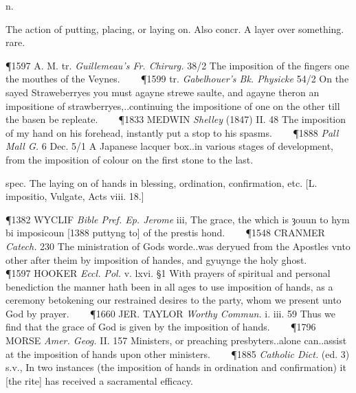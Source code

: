 \begin{description}[wide, labelwidth=!, labelindent=0pt]
 n.

\noindent {}

\vspace{-0.3cm}

\begin{myenumerate}

 The action of putting, placing, or laying on. Also concr. A layer over something. rare.

\P 1597 A. M. tr.  \textit{Guillemeau's Fr. Chirurg.} 38/2 The imposition of the fingers one the mouthes of the Veynes.    
\P 1599  tr. \textit{ Gabelhouer's Bk. Physicke} 54/2 On the sayed Straweberryes you must agayne strewe saulte, and agayne theron an impositione of strawberryes,..continuing the impositione of one on the other till the basen be repleate.    
\P 1833 MEDWIN  \textit{Shelley} (1847) II. 48 The imposition of my hand on his forehead, instantly put a stop to his spasms.    
\P 1888  \textit{Pall Mall G.} 6 Dec. 5/1 A Japanese lacquer box..in various stages of development, from the imposition of colour on the first stone to the last.

 spec. The laying on of hands in blessing, ordination, confirmation, etc. [L. impositio, Vulgate, Acts viii. 18.]

\P 1382 WYCLIF  \textit{Bible Pref. Ep. Jerome} iii, The grace, the which is ȝouun to hym bi imposicoun [1388 puttyng  to] of the prestis hond.    
\P 1548 CRANMER  \textit{Catech.} 230 The ministration of Gods worde..was deryued from the Apostles vnto other after theim by imposition of handes, and gyuynge the holy ghost.    
\P 1597 HOOKER  \textit{Eccl. Pol.} v. lxvi. §1 With prayers of spiritual and personal benediction the manner hath been in all ages to use imposition of hands, as a ceremony betokening our restrained desires to the party, whom we present unto God by prayer.    
\P 1660 JER. TAYLOR  \textit{Worthy Commun.} i. iii. 59 Thus we find that the grace of God is given by the imposition of hands.    
\P 1796 MORSE  \textit{Amer. Geog.} II. 157 Ministers, or preaching presbyters..alone can..assist at the imposition of hands upon other ministers.    
\P 1885  \textit{Catholic Dict.} (ed. 3) s.v., In two instances (the imposition of hands in ordination and confirmation) it [the rite] has received a sacramental efficacy.


\end{myenumerate}
\end{description}
